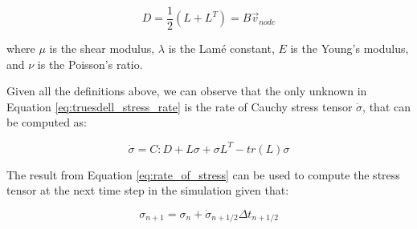\begin{equation}
    D = \frac{1}{2} (L + L^T) = B \vec{v}_{node}
    \label{eq:rate_of_deformation}
\end{equation}

where $\mu$ is the shear modulus, $\lambda$ is the Lamé constant, $E$ is the Young's modulus, and $\nu$ is the Poisson's ratio.

Given all the definitions above, we can observe that the only unknown in Equation \ref{eq:truesdell_stress_rate} is the rate of Cauchy stress tensor $\dot{\sigma}$, that can be computed as:

\begin{equation}
    \dot{\sigma} = C : D + L \sigma + \sigma L^T - tr(L) \sigma
    \label{eq:rate_of_stress}
\end{equation}

The result from Equation \ref{eq:rate_of_stress} can be used to compute the stress tensor at the next time step in the simulation given that:

\begin{equation}
    \sigma_{n+1} = \sigma_n + \dot{\sigma}_{n+1/2} \Delta t_{n+1/2}
\end{equation}